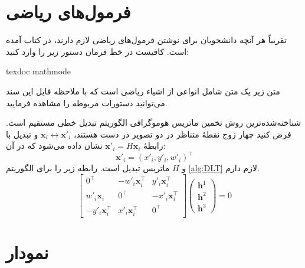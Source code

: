\doublespacing


\section{فرمول‌های ریاضی}
تقریباً هر آنچه دانشجویان برای نوشتن فرمول‌های ریاضی لازم دارند، در کتاب 
آمده است. کافیست در خط فرمان دستور زیر را وارد کنید:
\begin{latin}
texdoc mathmode
\end{latin}
متن زیر یک متن شامل انواعی از اشیاء ریاضی است که با ملاحظه فایل  این سند می‌توانید دستورات مربوطه را مشاهده فرمایید.

شناخته‌شده‌ترین روش تخمین ماتریس هوموگرافی الگوریتم تبدیل خطی مستقیم 
است.  فرض کنید چهار زوج نقطهٔ متناظر در دو تصویر در دست هستند،  $\mathbf{x}_i\leftrightarrow\mathbf{x}'_i$   و تبدیل با رابطهٔ
  $\mathbf{x}'_i = H\mathbf{x}_i$
  نشان داده می‌شود که در آن:
\[\mathbf{x}'_i=(x'_i,y'_i,w'_i)^\top  \]
و $H$ ماتریس تبدیل است.
رابطه زیر را برای الگوریتم  \eqref{alg:DLT} لازم دارم.
\begin{equation}\label{eq:DLT_Ah}
\left[
\begin{array}{ccc}
0^\top & -w'_i\mathbf{x}_i^\top & y'_i\mathbf{x}_i^\top \\ 
w'_i\mathbf{x}_i & 0^\top & -x'_i\mathbf{x}_i^\top \\ 
- y'_i\mathbf{x}_i^\top & x'_i\mathbf{x}_i^\top & 0^\top
\end{array} 
\right]
\left(
\begin{array}{c}
\mathbf{h}^1 \\ 
\mathbf{h}^2 \\ 
\mathbf{h}^3
\end{array} 
\right)=0
\end{equation}

\section{نمودار}

